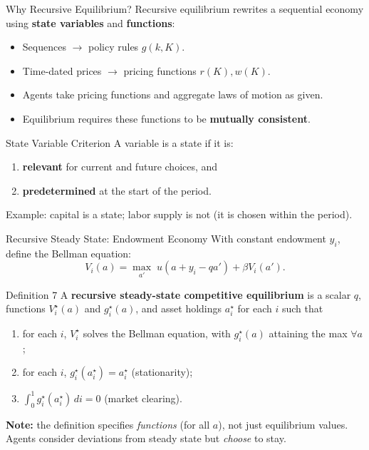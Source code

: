 \documentclass[aspectratio=169,10pt]{beamer}
\newcommand{\apxbutton}[1]{\hfill\hyperlink{#1}{\beamerbutton{Appendix}}}
\begin{document}
\begin{frame}{Why Recursive Equilibrium?}
Recursive equilibrium rewrites a sequential economy using \textbf{state variables} and \textbf{functions}:

\medskip
\begin{itemize}
  \item Sequences $\to$ policy rules $g(k,K)$.
  \item Time-dated prices $\to$ pricing functions $r(K), w(K)$.
  \item Agents take pricing functions and aggregate laws of motion as given.
  \item Equilibrium requires these functions to be \textbf{mutually consistent}.
\end{itemize}

\begin{block}{State Variable Criterion}
A variable is a state if it is:
\begin{enumerate}
  \item \textbf{relevant} for current and future choices, and
  \item \textbf{predetermined} at the start of the period.
\end{enumerate}
Example: capital is a state; labor supply is not (it is chosen within the period).
\end{block}
\end{frame}

\begin{frame}{Recursive Steady State: Endowment Economy}
\hypertarget{m-a7}{}
With constant endowment $y_i$, define the Bellman equation:
\[
V_i(a)=\max_{a'}\;u(a+y_i-qa')+\beta V_i(a').
\]

\begin{block}{Definition 7}
A \textbf{recursive steady-state competitive equilibrium} is a scalar $q$, functions $V_i^\star(a)$ and $g_i^\star(a)$, and asset holdings $a_i^\star$ for each $i$ such that
\begin{enumerate}
  \item for each $i$, $V_i^\star$ solves the Bellman equation, with $g_i^\star(a)$ attaining the max $\forall a$;
  \item for each $i$, $g_i^\star(a_i^\star)=a_i^\star$ (stationarity);
  \item $\int_0^1 g_i^\star(a_i^\star)\,di=0$ (market clearing).
\end{enumerate}
\end{block}

\medskip
\textbf{Note:} the definition specifies \emph{functions} (for all $a$), not just equilibrium values. Agents consider deviations from steady state but \emph{choose} to stay.
\apxbutton{a7}
\end{frame}
\end{document}
